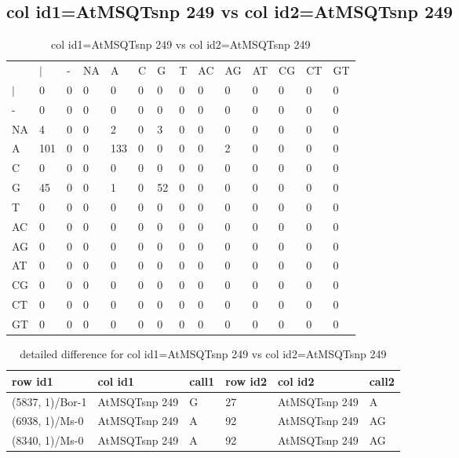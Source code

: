 \subsection{col id1=AtMSQTsnp 249 vs col id2=AtMSQTsnp 249}
\begin{center}
\begin{longtable}{|l|l|l|l|l|l|l|l|l|l|l|l|l|l|}
\caption{col id1=AtMSQTsnp 249 vs col id2=AtMSQTsnp 249} \label{table_dm802}\\
\hline
\\
\hline
&$|$&-&NA&A&C&G&T&AC&AG&AT&CG&CT&GT\\
$|$&0&0&0&0&0&0&0&0&0&0&0&0&0\\
-&0&0&0&0&0&0&0&0&0&0&0&0&0\\
NA&4&0&0&2&0&3&0&0&0&0&0&0&0\\
A&101&0&0&133&0&0&0&0&2&0&0&0&0\\
C&0&0&0&0&0&0&0&0&0&0&0&0&0\\
G&45&0&0&1&0&52&0&0&0&0&0&0&0\\
T&0&0&0&0&0&0&0&0&0&0&0&0&0\\
AC&0&0&0&0&0&0&0&0&0&0&0&0&0\\
AG&0&0&0&0&0&0&0&0&0&0&0&0&0\\
AT&0&0&0&0&0&0&0&0&0&0&0&0&0\\
CG&0&0&0&0&0&0&0&0&0&0&0&0&0\\
CT&0&0&0&0&0&0&0&0&0&0&0&0&0\\
GT&0&0&0&0&0&0&0&0&0&0&0&0&0\\
\hline
\end{longtable}
\end{center}

\begin{center}
\begin{longtable}{|l|l|l|l|l|l|}
\caption{detailed difference for col id1=AtMSQTsnp 249 vs col id2=AtMSQTsnp 249} \label{table_dm803}\\
\hline
row id1&col id1&call1&row id2&col id2&call2\\
\hline
(5837, 1)/Bor-1&AtMSQTsnp 249&G&27&AtMSQTsnp 249&A\\
(6938, 1)/Ms-0&AtMSQTsnp 249&A&92&AtMSQTsnp 249&AG\\
(8340, 1)/Ms-0&AtMSQTsnp 249&A&92&AtMSQTsnp 249&AG\\
\hline
\end{longtable}
\end{center}

